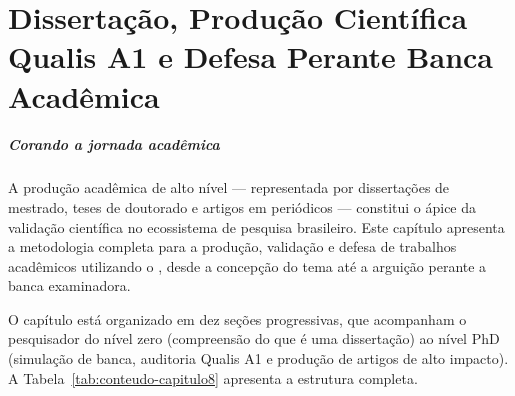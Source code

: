 \chapter{Dissertação, Produção Científica Qualis A1 e Defesa Perante Banca Acadêmica}
\label{cap:dissertacao-banca}

\paragraph{Corando a jornada acadêmica} A produção acadêmica de alto nível --- representada por dissertações de mestrado,
teses de doutorado e artigos em periódicos \qualisA{} --- constitui o ápice da
validação científica no ecossistema de pesquisa brasileiro. Este capítulo
apresenta a metodologia completa para a produção, validação e defesa de trabalhos
acadêmicos utilizando o \opencodeeco{}, desde a concepção do tema até a arguição
perante a banca examinadora.

O capítulo está organizado em dez seções progressivas, que acompanham o
pesquisador do nível zero (compreensão do que é uma dissertação) ao nível PhD
(simulação de banca, auditoria Qualis A1 e produção de artigos de alto impacto).
A Tabela~\ref{tab:conteudo-capitulo8} apresenta a estrutura completa.

\begin{table}[htb]
\centering
    \small
\caption{Estrutura do Capítulo 8}
\label{tab:conteudo-capitulo8}
\end{table}


